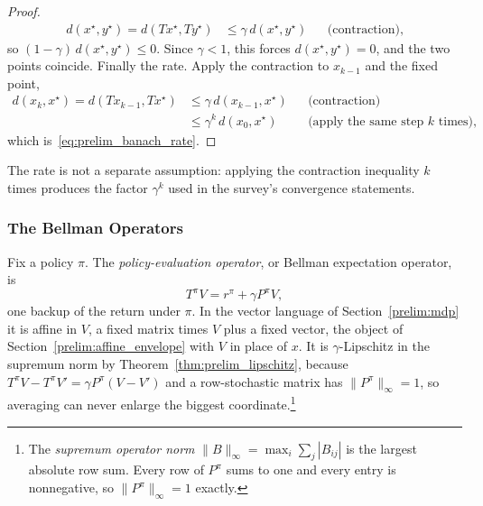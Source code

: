 \begin{proof}
\begin{align*}
d(x^\star, y^\star) = d(Tx^\star, Ty^\star) &\leq \gamma\, d(x^\star, y^\star) && \text{(contraction),}
\end{align*}
so $(1-\gamma)\, d(x^\star, y^\star) \leq 0$. Since $\gamma < 1$, this forces $d(x^\star, y^\star) = 0$, and the two points coincide. Finally the rate. Apply the contraction to $x_{k-1}$ and the fixed point,
\begin{align*}
d(x_k, x^\star) = d(Tx_{k-1}, Tx^\star)
  &\leq \gamma\, d(x_{k-1}, x^\star) && \text{(contraction)} \\
  &\leq \gamma^k\, d(x_0, x^\star) && \text{(apply the same step $k$ times),}
\end{align*}
which is~\eqref{eq:prelim_banach_rate}.
\end{proof}

The rate is not a separate assumption: applying the contraction inequality $k$ times produces the factor $\gamma^k$ used in the survey's convergence statements.

\subsubsection{The Bellman Operators}

Fix a policy $\pi$. The \emph{policy-evaluation operator}, or Bellman expectation operator, is
\begin{equation}
T^\pi V = r^\pi + \gamma P^\pi V,
\label{eq:prelim_tpi}
\end{equation}
one backup of the return under $\pi$. In the vector language of Section~\ref{prelim:mdp} it is affine in $V$, a fixed matrix times $V$ plus a fixed vector, the object of Section~\ref{prelim:affine_envelope} with $V$ in place of $x$. It is $\gamma$-Lipschitz in the supremum norm by Theorem~\ref{thm:prelim_lipschitz}, because $T^\pi V - T^\pi V' = \gamma P^\pi (V - V')$ and a row-stochastic matrix has $\|P^\pi\|_\infty = 1$, so averaging can never enlarge the biggest coordinate.\footnote{The \emph{supremum operator norm} $\|B\|_\infty = \max_i \sum_j |B_{ij}|$ is the largest absolute row sum. Every row of $P^\pi$ sums to one and every entry is nonnegative, so $\|P^\pi\|_\infty = 1$ exactly.}

